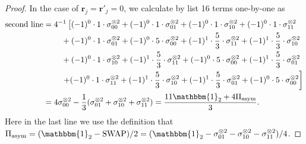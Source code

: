 \documentclass[aps,%
twocolumn,%
floatfix,%
pra,%
amsfonts,%
groupedaddress,%
superscriptaddress]{revtex4-2}%
\newcommand{\1}{\mathbbm{1}}
\begin{document}
\begin{proof}
    In the case of $\mathbf{r}_j =\mathbf{r}'_j= 0$, we calculate by list 16 terms one-by-one as
    \begin{align}
        \text{second line} 
        &= 4^{-1}\left[(-1)^{0} \cdot 1\cdot  \sigma_{00}^{\otimes 2} +  (-1)^{0} \cdot 1\cdot  \sigma_{01}^{\otimes 2} +(-1)^{0} \cdot 1\cdot   \sigma_{10}^{\otimes 2} + (-1)^{0} \cdot 1\cdot   \sigma_{11}^{\otimes 2}\right. \notag\\
        &\hspace{0.8cm} + (-1)^{0} \cdot 1\cdot \sigma_{01}^{\otimes 2} + (-1)^{0} \cdot 5\cdot \sigma_{00}^{\otimes 2} + (-1)^{1} \cdot \frac{5}{3}\cdot\sigma_{11}^{\otimes 2} +  (-1)^{1} \cdot \frac{5}{3}\cdot \sigma_{10}^{\otimes 2} \notag\\
        &\hspace{0.8cm}+ (-1)^{0} \cdot 1\cdot \sigma_{10}^{\otimes 2} +  (-1)^{1} \cdot \frac{5}{3}\cdot \sigma_{11}^{\otimes 2} + (-1)^{0} \cdot 5\cdot \sigma_{00}^{\otimes 2} + (-1)^{1} \cdot \frac{5}{3}\cdot \sigma_{01}^{\otimes 2} \notag\\
        &\left.\hspace{0.8cm}+ (-1)^{0} \cdot 1\cdot \sigma_{11}^{\otimes 2} + (-1)^{1} \cdot \frac{5}{3}\cdot \sigma_{10}^{\otimes 2} + (-1)^{1} \cdot \frac{5}{3}\cdot \sigma_{01}^{\otimes 2} + (-1)^{0} \cdot 5\cdot \sigma_{00}^{\otimes 2} \right]\\
        &= 4 \sigma_{00}^{\otimes 2} - \frac{1}{3}(\sigma_{01}^{\otimes 2}+\sigma_{10}^{\otimes 2}+\sigma_{11}^{\otimes 2}) = \frac{11\1_2 + 4 \Pi_{\mathrm{asym}}}{3}.
    \end{align}
    Here in the last line we use the definition that $\Pi_{\mathrm{asym}} = (\1_2 - \text{SWAP})/2 = {(\1_2 -\sigma_{01}^{\otimes 2}-\sigma_{10}^{\otimes 2}-\sigma_{11}^{\otimes 2})}/{4}$.


\end{proof}
\end{document}
